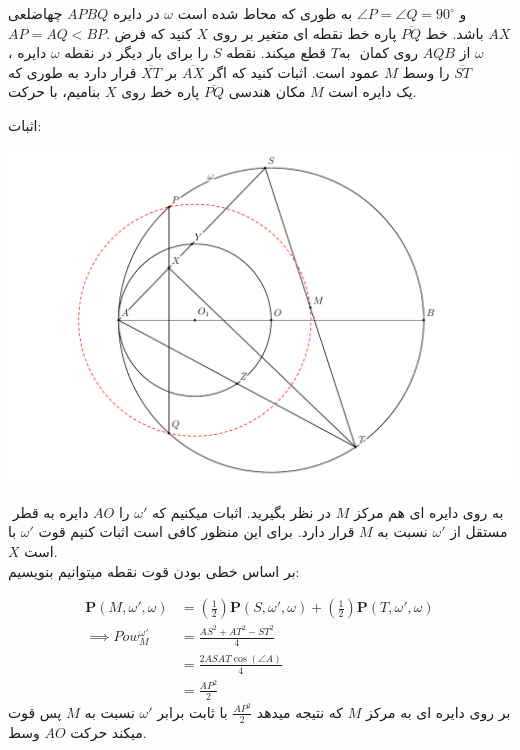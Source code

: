 \documentclass{article}
\begin{document}
\begin{exam}{}{}
چهاضلعی ‎‎$‎APBQ‎$‎ ‏در دایره ‎‎$‎\omega‎$‎ ‏محاط شده است ‎‎‏به طوری که ‎‎$‎\angle P=\angle ‎Q‎=90^\circ$‎‎‎‎ ‏و\\ ‎‎$‎AP=AQ<BP‎$‏. ‎فرض‎ کنید که ‎‎$‎X‎$‎‎‎‎ ‏نقطه ای متغیر بر روی ‎‎‏پاره خط ‎‎$‎‎\overline{PQ}‎‎$‎ ‏باشد. خط ‎‎$‎AX‎‎‏$‏،‎‎‎‎‎ دایره ‎‎$‎‎\omega‎‎$‎ ‏را برای بار دیگر در نقطه ‎‎$‎S‎$‎ ‏قطع میکند. نقطه ‎$‎‎‎T‎$‎‎‏ ‏به‎‎ روی کمان ‎‎‎$‎AQB‎$‎‎‎‎ ‏از ‎‎$‎‎\omega‎‎$‎ ‏قرار دارد به طوری که ‎‎$‎\overline{XT}‎$‎ ‏بر ‎‎$‎\overline{AX}‎$‎ ‏عمود است. اثبات کنید که اگر ‎‎$‎M‎$‎ ‏را وسط ‎‎$‎\overline{ST}‎$‎‎‎ ‏بنامیم‏، با حرکت ‎‎$‎X‎$‎ ‏روی ‎‏پاره خط ‎$\overline{PQ}‎$‎‎‎‎ ‏مکان هندسی ‎‎$‎M‎$‎ ‏یک دایره است‎.‎
\end{exam}
\newpage
اثبات:

\includegraphics[scale=0.6]{usa2015.pdf}

‎‎
دایره به قطر ‎‎$‎AO‎$‎ ‏را ‎$‎‎‎\omega'‎$‎ در نظر بگیرید. اثبات میکنیم که ‎‎$‎M‎$‎ ‏به روی دایره ای هم مرکز با ‎$‎‎\omega‎'‎$‎ ‏قرار دارد. برای این منظور کافی است اثبات کنیم قوت ‎‎$‎M‎$‎ نسبت به ‎‎$‎\omega'‎$‎ مستقل از ‎‎$‎X‎$‎ ‏است.
\\
بر اساس خطی بودن قوت نقطه میتوانیم بنویسیم:

\begin{align*}
    \mathbf{P}(M,\omega',\omega)&=(\frac12)\mathbf{P}(S,\omega',\omega)+(\frac12)\mathbf{P}(T,\omega',\omega)\\
    \implies Pow_M^{\omega'}&=\frac{AS^2+AT^2-ST^2}{4}\\
    &= \frac{2 AS \dot AT \cos{(\angle A)}}{4}\\
    &=\frac{AP^2}{2}
\end{align*}
پس قوت ‎$M‎$‎‎ ‏نسبت به ‎‎$‎\omega'‎$‎ برابر‎‎ با ثابت ‎‎$‎‎\frac{AP^2}{2}‎$‎‎ ‏که نتیجه میدهد ‎‎$‎M‎$‎ ‏بر روی دایره ای به مرکز وسط ‎‎$‎AO‎$ ‏‎حرکت‎ میکند.
\end{document}
